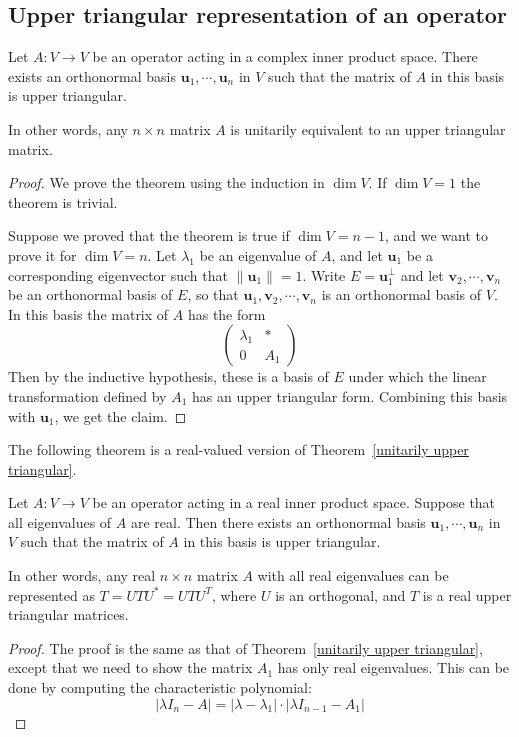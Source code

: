 \subsection{Upper triangular representation of an operator}
\begin{theorem}\label{unitarily upper triangular}
Let $A:V\to V$ be an operator acting in a complex inner product space. There exists an orthonormal basis $\bm{u}_1,\cdots,\bm{u}_n$ in $V$ such that the matrix of $A$ in this basis is upper triangular.\par
In other words, any $n\times n$ matrix $A$ is unitarily equivalent to an upper triangular matrix.
\end{theorem}
\begin{proof}
We prove the theorem using the induction in $\dim V$. If $\dim V=1$ the theorem is trivial.\par
Suppose we proved that the theorem is true if $\dim V=n-1$, and we want to prove it for $\dim V=n$. Let $\lambda_1$ be an eigenvalue of $A$, and let $\bm{u}_1$ be a corresponding eigenvector such that $\|\bm{u}_1\|=1$. Write $E=\bm{u}_1^\bot$ and let $\bm{v}_2,\cdots,\bm{v}_n$ be an orthonormal basis of $E$, so that $\bm{u}_1,\bm{v}_2,\cdots,\bm{v}_n$ is an orthonormal basis of $V$. In this basis the matrix of $A$ has the form
\[\begin{pmatrix}
\lambda_1&*\\
0&A_1
\end{pmatrix}\]
Then by the inductive hypothesis, these is a basis of $E$ under which the linear transformation defined by $A_1$ has an upper triangular form. Combining this basis with $\bm{u}_1$, we get the claim.
\end{proof}
The following theorem is a real-valued version of Theorem~\ref{unitarily upper triangular}.
\begin{theorem}\label{orthogonal upper triangular}
Let $A:V\to V$ be an operator acting in a real inner product space. Suppose that all eigenvalues of $A$ are real. Then there exists an orthonormal basis $\bm{u}_1,\cdots,\bm{u}_n$ in $V$ such that the matrix of $A$ in this basis is upper triangular.\par
In other words, any real $n\times n$ matrix $A$ with all real eigenvalues can be represented as $T=UTU^*=UTU^T$, where $U$ is an orthogonal, and $T$ is a real upper triangular matrices.
\end{theorem}
\begin{proof}
The proof is the same as that of Theorem~\ref{unitarily upper triangular}, except that we need to show the matrix $A_1$ has only real eigenvalues. This can be done by computing the characteristic polynomial:
\[|\lambda I_n-A|=|\lambda-\lambda_1|\cdot|\lambda I_{n-1}-A_1|\]
\end{proof}
